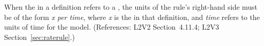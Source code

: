 When the  in a \RateRule definition refers to a \Parameter,
the units of the rule's right-hand side must be of the form \emph{x per
time}, where \emph{x} is the  in that \Parameter definition,
and \emph{time} refers to the units of time for the model.  (References:
L2V2 Section~4.11.4; L2V3 Section~\ref{sec:raterule}.)
